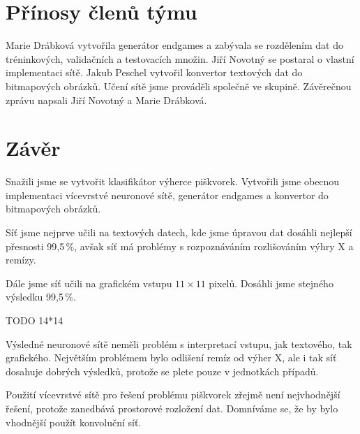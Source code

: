 \documentclass[10pt,a4paper]{article}
\begin{document}
\FloatBarrier
\section*{Přínosy členů týmu}
Marie Drábková vytvořila generátor endgames a zabývala se rozdělením dat do tréninkových, validačních a testovacích množin. 
Jiří Novotný se postaral o vlastní implementaci sítě.
Jakub Peschel vytvořil konvertor textových dat do bitmapových obrázků.
Učení sítě jsme prováděli společně ve skupině.
Závěrečnou zprávu napsali Jiří Novotný a Marie Drábková.

\section*{Závěr}
Snažili jsme se vytvořit klasifikátor výherce piškvorek. Vytvořili jsme obecnou implementaci vícevrstvé neuronové sítě, generátor endgames a konvertor do bitmapových obrázků. 

Síť jsme nejprve učili na textových datech, kde jsme úpravou dat dosáhli nejlepší přesnosti 99,5\,\%, avšak síť má problémy s rozpoznáváním rozlišováním výhry X a remízy. 

Dále jsme síť učili na grafickém vstupu $11\times 11$ pixelů. 
Dosáhli jsme stejného výsledku 99,5\,\%.

TODO 14*14

Výsledné neuronové sítě neměli problém s interpretací vstupu, jak textového, tak grafického. Největším problémem bylo odlišení remíz od výher X, ale i tak síť dosahuje dobrých výsledků, protože se plete pouze v jednotkách případů. 

Použití vícevrstvé sítě pro řešení problému piškvorek zřejmě není nejvhodnější řešení, protože zanedbává prostorové rozložení dat. Domníváme se, že by bylo vhodnější použít konvoluční síť.
\end{document}
